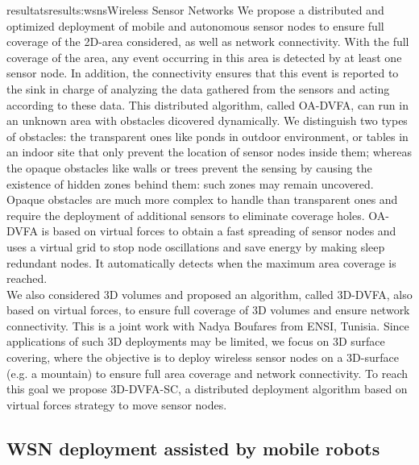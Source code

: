 \documentclass{ra2016}
\begin{document}
\begin{module}{resultats}{results:wsns}{Wireless Sensor Networks}
We propose a distributed and optimized deployment of mobile and autonomous sensor nodes to ensure full coverage of the 2D-area considered, as well as network connectivity. With the full coverage of the area, any event occurring in this area is detected by at least one sensor node. In addition, the connectivity ensures that this event is reported to the sink in charge of analyzing the data gathered from the sensors and acting according to these data. This distributed algorithm, called OA-DVFA, can run in an unknown area with obstacles dicovered dynamically.  We distinguish two types of obstacles: the transparent ones like ponds in outdoor environment, or tables in an indoor site that only prevent the location of sensor nodes inside them; whereas the opaque obstacles like walls or trees prevent the sensing by causing the existence of hidden zones behind them: such zones may remain uncovered. Opaque obstacles are much more complex to handle than transparent ones and require the deployment of additional sensors to eliminate coverage holes. OA-DVFA is based on virtual forces to obtain a fast spreading of sensor nodes and uses a virtual grid to stop node oscillations and save energy by making sleep redundant nodes. It automatically detects when the maximum area coverage is reached.\\
  
We also considered 3D volumes and proposed an algorithm, called 3D-DVFA, also based on virtual forces, to ensure full coverage of 3D volumes and ensure network connectivity. This is a joint work with Nadya Boufares from ENSI, Tunisia. Since applications of such 3D deployments may be limited, we focus on 3D surface covering, where the objective is to deploy wireless sensor nodes on a 3D-surface (e.g. a mountain) to ensure full area coverage and network connectivity. To reach this goal we propose 3D-DVFA-SC, a distributed deployment
algorithm based on virtual forces strategy to move sensor nodes.



\subsection{WSN deployment assisted by mobile robots}

\begin{participants}
\end{participants}


\end{module}
\end{document}
